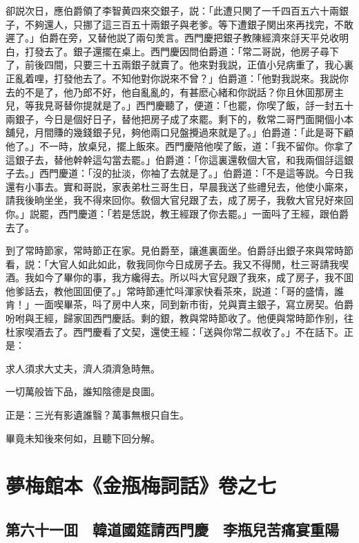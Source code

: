 卻説次日，應伯爵領了李智黄四來交銀子，説：「此遭只関了一千四百五六十兩銀子，不夠還人，只挪了這三百五十兩銀子與老爹。等下遭銀子関出來再找完，不敢遲了。」伯爵在旁，又替他説了兩句羙言。西門慶把銀子教陳經濟來㧱天平兑收明白，打發去了。銀子還擺在桌上。西門慶因問伯爵道：「常二哥説，他房子尋下了，前後四間，只要三十五兩銀子就賣了。他來對我説，正值小兒病重了，我心裏正亂着哩，打發他去了。不知他對你説來不曾？」伯爵道：「他對我説來。我説你去的不是了，他乃郎不好，他自亂亂的，有甚麽心緒和你説話？你且休囬那房主兒，等我見哥替你提就是了。」西門慶聽了，便道：「也罷，你喫了飯，㧱一封五十兩銀子，今日是個好日子，替他把房子成了來罷。剩下的，敎常二哥門面開個小本舖兒，月間賺的幾錢銀子兒，夠他兩口兒盤攪過來就是了。」伯爵道：「此是哥下顧他了。」不一時，放桌兒，擺上飯來。西門慶陪他喫了飯，道：「我不留你。你拿了這銀子去，替他幹幹這勾當去罷。」伯爵道：「你這裏還敎個大官，和我兩個㧱這銀子去。」西門慶道：「沒的扯淡，你袖了去就是了。」伯爵道：「不是這等説。今日我還有小事去。實和哥説，家表弟杜三哥生日，早晨我送了些禮兒去，他使小廝來，請我後晌坐坐，我不得來回你。敎個大官兒跟了去，成了房子，我敎大官兒好來回你。」説罷，西門慶道：「若是恁説，教王經跟了你去罷。」一面呌了王經，跟伯爵去了。

到了常時節家，常時節正在家。見伯爵至，讓進裏面坐。伯爵㧱出銀子來與常時節看，説：「大官人如此如此，敎我同你今日成房子去。我又不得閒，杜三哥請我喫酒。我如今了畢你的事，我方纔得去。所以呌大官兒跟了我來，成了房子，我不囬他爹話去，教他囬囬便了。」常時節連忙呌渾家快看茶來，説道：「哥的盛情，誰肯！」一面喫畢茶，呌了房中人來，同到新市街，兑與賣主銀子，寫立房契。伯爵吩咐與王經，歸家囬西門慶話。剩的銀，教與常時節收了。他便與常時節作别，往杜家喫酒去了。西門慶看了文契，還使王經：「送與你常二叔收了。」不在話下。正是：

求人須求大丈夫，濟人須濟急時無。

一切萬般皆下品，誰知陰德是良圖。

正是：三光有影遺誰翳？萬事無根只自生。

畢竟未知後來何如，且聽下回分解。

\part*{夢梅館本《金瓶梅詞話》卷之七}

\chapter*{第六十一囬　韓道國筵請西門慶　李瓶兒苦痛宴重陽}


